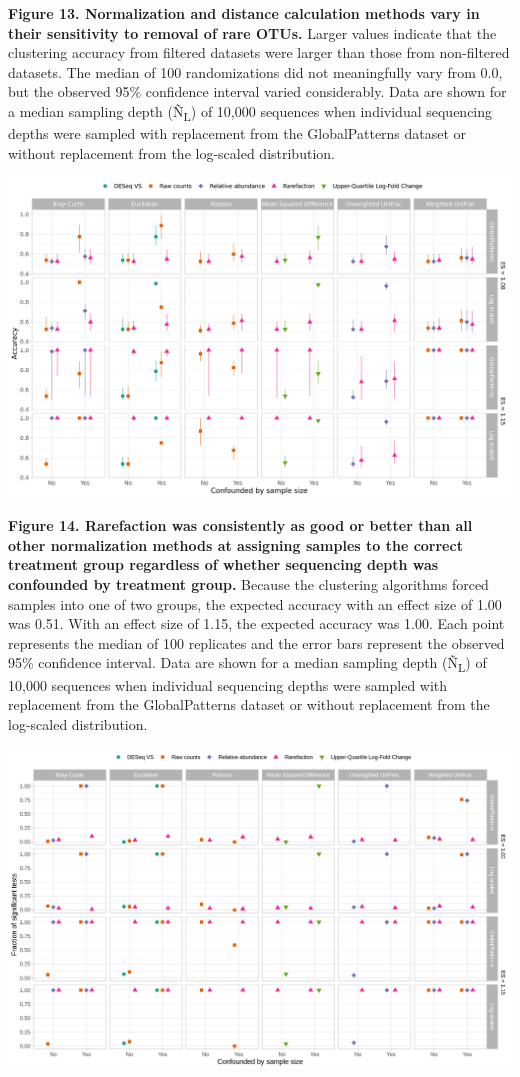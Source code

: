 \documentclass[
]{article}
\begin{document}
\textbf{Figure 13. Normalization and distance calculation methods vary
in their sensitivity to removal of rare OTUs.} Larger values indicate
that the clustering accuracy from filtered datasets were larger than
those from non-filtered datasets. The median of 100 randomizations did
not meaningfully vary from 0.0, but the observed 95\% confidence
interval varied considerably. Data are shown for a median sampling depth
(Ñ\textsubscript{L}) of 10,000 sequences when individual sequencing
depths were sampled with replacement from the GlobalPatterns dataset or
without replacement from the log-scaled distribution.

\newpage

\includegraphics{figure_14.png}

\textbf{Figure 14. Rarefaction was consistently as good or better than
all other normalization methods at assigning samples to the correct
treatment group regardless of whether sequencing depth was confounded by
treatment group.} Because the clustering algorithms forced samples into
one of two groups, the expected accuracy with an effect size of 1.00 was
0.51. With an effect size of 1.15, the expected accuracy was 1.00. Each
point represents the median of 100 replicates and the error bars
represent the observed 95\% confidence interval. Data are shown for a
median sampling depth (Ñ\textsubscript{L}) of 10,000 sequences when
individual sequencing depths were sampled with replacement from the
GlobalPatterns dataset or without replacement from the log-scaled
distribution.

\newpage

\includegraphics{figure_15.png}
\end{document}
